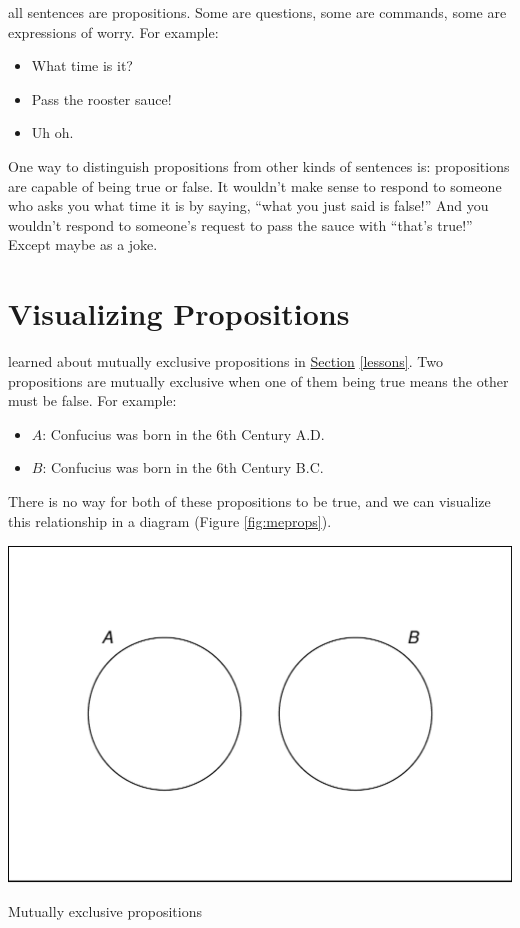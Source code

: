 \documentclass[justified]{tufte-book}
\providecommand{\tightlist}{%
  \setlength{\itemsep}{0pt}\setlength{\parskip}{0pt}}
\theoremstyle{definition}
\theoremstyle{definition}
\theoremstyle{definition}
\theoremstyle{remark}
\begin{document}
 all sentences are propositions. Some are questions, some are commands, some are expressions of worry. For example:

\begin{itemize}
\tightlist
\item
  What time is it?
\item
  Pass the rooster sauce!
\item
  Uh oh.
\end{itemize}

One way to distinguish propositions from other kinds of sentences is: propositions are capable of being true or false. It wouldn't make sense to respond to someone who asks you what time it is by saying, ``what you just said is false!'' And you wouldn't respond to someone's request to pass the sauce with ``that's true!'' Except maybe as a joke.

\hypertarget{visualizing-propositions}{%
\section{Visualizing Propositions}\label{visualizing-propositions}}

 learned about mutually exclusive propositions in \protect\hyperlink{lessons}{Section} \ref{lessons}. Two propositions are mutually exclusive when one of them being true means the other must be false. For example:

\begin{itemize}
\tightlist
\item
  \(A\): Confucius was born in the 6th Century A.D.
\item
  \(B\): Confucius was born in the 6th Century B.C.
\end{itemize}

There is no way for both of these propositions to be true, and we can visualize this relationship in a diagram (Figure \ref{fig:meprops}).

\begin{marginfigure}
\includegraphics{_main_files/figure-latex/meprops-1} \caption[Mutually exclusive propositions]{Mutually exclusive propositions}\label{fig:meprops}
\end{marginfigure}
\end{document}
